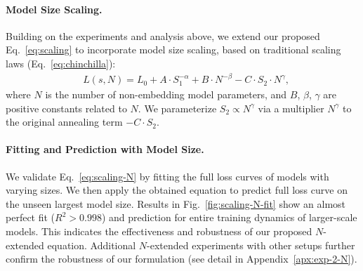 \paragraph{Model Size Scaling.} Building on the experiments and analysis above, we extend our proposed Eq.~\ref{eq:scaling} to incorporate model size scaling, based on traditional scaling laws (Eq.~\ref{eq:chinchilla}):
\begin{equation}
\begin{aligned}
& L(s, N) = L_0 + A\cdot S_1^{-\alpha} + B\cdot N^{-\beta}- C\cdot S_2 \cdot N^{\gamma},
\end{aligned}
\label{eq:scaling-N}
\end{equation}
where $N$ is the number of non-embedding model parameters, and $B$, $\beta$, $\gamma$ are positive constants related to $N$.
We parameterize $S_2 \propto N^{\gamma}$ via a multiplier $N^{\gamma}$ to the original annealing term $-C\cdot S_2$.

\paragraph{Fitting and Prediction with Model Size.}
We validate Eq.~\ref{eq:scaling-N} by fitting the full loss curves of models with varying sizes.
We then apply the obtained equation to predict full loss curve on the unseen largest model size.
Results in Fig.~\ref{fig:scaling-N-fit} show an almost perfect fit ($R^2>0.998$) and prediction for entire training dynamics of larger-scale models. This indicates the effectiveness and robustness of our proposed $N$-extended equation.
Additional $N$-extended experiments with other setups further confirm the robustness of our formulation (see detail in Appendix~\ref{apx:exp-2-N}).
